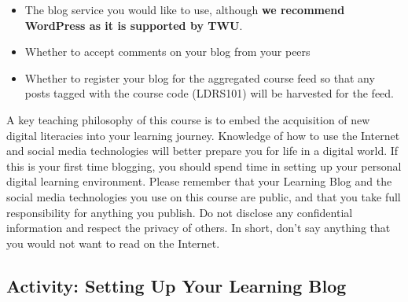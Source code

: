 \documentclass[
]{book}
\providecommand{\tightlist}{%
  \setlength{\itemsep}{0pt}\setlength{\parskip}{0pt}}
\theoremstyle{definition}
\theoremstyle{definition}
\theoremstyle{definition}
\theoremstyle{definition}
\theoremstyle{remark}
\begin{document}
\begin{itemize}
\tightlist
\item
  The blog service you would like to use, although \textbf{we recommend WordPress as it is supported by TWU}.\\
\item
  Whether to accept comments on your blog from your peers\\
\item
  Whether to register your blog for the aggregated course feed so that any posts tagged with the course code (LDRS101) will be harvested for the feed.
\end{itemize}

A key teaching philosophy of this course is to embed the acquisition of new digital literacies into your learning journey. Knowledge of how to use the Internet and social media technologies will better prepare you for life in a digital world. If this is your first time blogging, you should spend time in setting up your personal digital learning environment. Please remember that your Learning Blog and the social media technologies you use on this course are public, and that you take full responsibility for anything you publish. Do not disclose any confidential information and respect the privacy of others. In short, don't say anything that you would not want to read on the Internet.

\hypertarget{activity-setting-up-your-learning-blog}{%
\subsection*{Activity: Setting Up Your Learning Blog}\label{activity-setting-up-your-learning-blog}}
\end{document}
